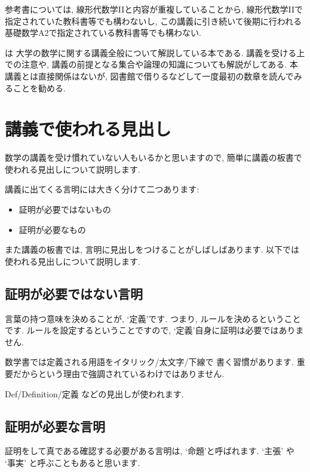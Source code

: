 参考書については,
線形代数学IIと内容が重複していることから,
線形代数学IIで指定されていた教科書等でも構わないし,
この講義に引き続いて後期に行われる
基礎数学A2で指定されている教科書等でも構わない.



\cite{978-4-535-78682-0}は
大学の数学に関する講義全般について解説している本である.
講義を受ける上での注意や,
講義の前提となる集合や論理の知識についても解説がしてある.
本講義とは直接関係はないが,
図書館で借りるなどして一度最初の数章を読んでみることを勧める.

\section{講義で使われる見出し}
数学の講義を受け慣れていない人もいるかと思いますので,
簡単に講義の板書で使われる見出しについて説明します.

講義に出てくる言明には大きく分けて二つあります:
\begin{itemize}
 \item 証明が必要ではないもの
 \item 証明が必要なもの
\end{itemize}
また講義の板書では,
言明に見出しをつけることがしばしばあります.
以下では使われる見出しについて説明します.
\subsection{証明が必要ではない言明}
言葉の持つ意味を決めることが,
`定義'です.
つまり, ルールを決めるということです.
ルールを設定するということですので,
`定義'自身に証明は必要ではありません.

数学書では定義される用語をイタリック/太文字/下線で
書く習慣があります.
重要だからという理由で強調されているわけではありません.

Def/Definition/定義 などの見出しが使われます.

\subsection{証明が必要な言明}
証明をして真である確認する必要がある言明は,
`命題'と呼ばれます.
`主張' や `事実' と呼ぶこともあると思います.

